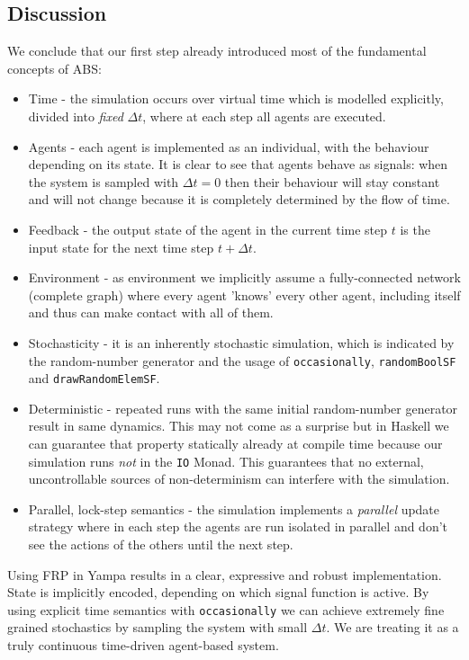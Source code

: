 \subsection{Discussion}
We conclude that our first step already introduced most of the fundamental concepts of ABS:
\begin{itemize}
	\item Time - the simulation occurs over virtual time which is modelled explicitly, divided into \textit{fixed} $\Delta t$, where at each step all agents are executed.
	\item Agents - each agent is implemented as an individual, with the behaviour depending on its state. It is clear to see that agents behave as signals: when the system is sampled with $\Delta t = 0$ then their behaviour will stay constant and will not change because it is completely determined by the flow of time. 
	\item Feedback - the output state of the agent in the current time step $t$ is the input state for the next time step $t + \Delta t$.
	\item Environment - as environment we implicitly assume a fully-connected network (complete graph) where every agent 'knows' every other agent, including itself and thus can make contact with all of them.
	\item Stochasticity - it is an inherently stochastic simulation, which is indicated by the random-number generator and the usage of \texttt{occasionally}, \texttt{randomBoolSF} and \texttt{drawRandomElemSF}.
	\item Deterministic - repeated runs with the same initial random-number generator result in same dynamics. This may not come as a surprise but in Haskell we can guarantee that property statically already at compile time because our simulation runs \textit{not} in the \texttt{IO} Monad. This guarantees that no external, uncontrollable sources of non-determinism can interfere with the simulation.
	\item Parallel, lock-step semantics - the simulation implements a \textit{parallel} update strategy where in each step the agents are run isolated in parallel and don't see the actions of the others until the next step.
\end{itemize}

Using FRP in Yampa results in a clear, expressive and robust implementation. State is implicitly encoded, depending on which signal function is active. By using explicit time semantics with \texttt{occasionally} we can achieve extremely fine grained stochastics by sampling the system with small $\Delta t$. We are treating it as a truly continuous time-driven agent-based system.

